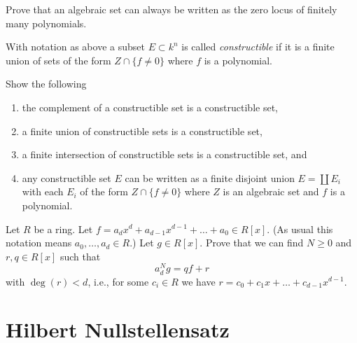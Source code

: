 \begin{exercise}
\label{exercise-finite-nr-equations}
Prove that an algebraic set can always be written as the zero locus
of finitely many polynomials.
\end{exercise}

\noindent
With notation as above a subset $E \subset k^n$ is called
{\it constructible} if it is a finite union of sets of the form
$Z \cap \{f \not = 0\}$ where $f$ is a polynomial.

\begin{exercise}
\label{exercise-constructible-classical}
Show the following
\begin{enumerate}
\item the complement of a constructible set is a constructible set,
\item a finite union of constructible sets is a constructible set,
\item a finite intersection of constructible sets is a constructible set, and
\item any constructible set $E$ can be written as a finite disjoint union
$E = \coprod E_i$ with each $E_i$ of the form $Z \cap \{f \not = 0\}$
where $Z$ is an algebraic set and $f$ is a polynomial.
\end{enumerate}
\end{exercise}

\begin{exercise}
\label{exercise-division-with-remainder}
Let $R$ be a ring. Let
$f = a_d x^d + a_{d - 1} x^{d - 1} + \ldots + a_0 \in R[x]$.
(As usual this notation means $a_0, \ldots, a_d \in R$.) Let $g \in R[x]$.
Prove that we can find $N \geq 0$ and $r, q \in R[x]$ such that
$$
a_d^N g = q f + r
$$
with $\deg(r) < d$, i.e., for some $c_i \in R$ we have
$r = c_0 + c_1 x + \ldots + c_{d - 1}x^{d - 1}$.
\end{exercise}







\section{Hilbert Nullstellensatz}
\label{section-Hilbert-Nullstellensatz}


